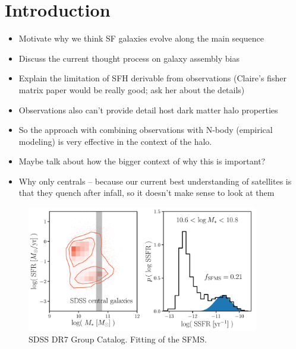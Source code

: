 \documentclass[12pt, letterpaper, preprint]{aastex}
\newcommand{\bitem}{\begin{itemize}}
\newcommand{\eitem}{\end{itemize}}
\begin{document}
\section{Introduction}
\bitem 
\item Motivate why we think SF galaxies evolve along the main sequence  
\item Discuss the current thought process on galaxy assembly bias 
\item Explain the limitation of SFH derivable from observations (Claire's fisher matrix paper would be really good; ask her about the details) 
\item Observations also can't provide detail host dark matter halo properties
\item So the approach with combining observations with N-body (empirical modeling) is very effective in the context of the halo.
\item Maybe talk about how the bigger context of why this is important?  
\item Why only centrals -- because our current best understanding of satellites is that they quench after infall, so it doesn't make sense to look at them
\eitem 

\begin{figure}
\begin{center}
\includegraphics[width=0.9\textwidth]{figs/groupcat.pdf}
\caption{SDSS DR7 Group Catalog. Fitting of the SFMS.}
\label{fig:groupcat}
\end{center}
\end{figure}
\end{document}
